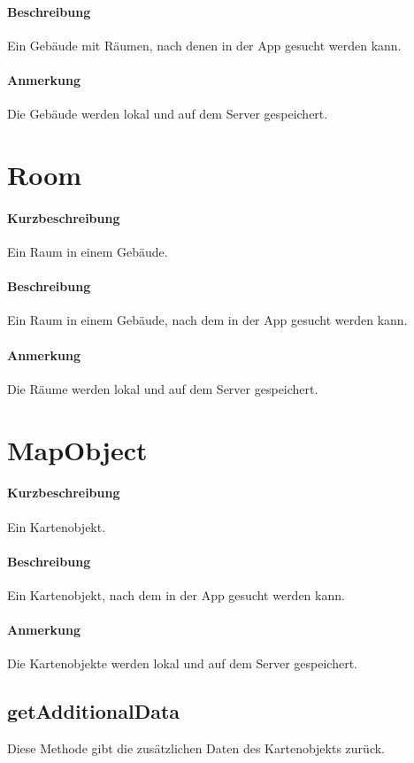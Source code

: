 \paragraph*{Beschreibung}
Ein Gebäude mit Räumen, nach denen in der App gesucht werden kann.
\paragraph*{Anmerkung}
Die Gebäude werden lokal und auf dem Server gespeichert.


\section{Room}
\paragraph*{Kurzbeschreibung}
Ein Raum in einem Gebäude.
\paragraph*{Beschreibung}
Ein Raum in einem Gebäude, nach dem in der App gesucht werden kann.
\paragraph*{Anmerkung}
Die Räume werden lokal und auf dem Server gespeichert.


\section{MapObject}
\paragraph*{Kurzbeschreibung}
Ein Kartenobjekt.
\paragraph*{Beschreibung}
Ein Kartenobjekt, nach dem in der App gesucht werden kann.
\paragraph*{Anmerkung}
Die Kartenobjekte werden lokal und auf dem Server gespeichert.

\subsection{getAdditionalData}%
Diese Methode gibt die zusätzlichen Daten des Kartenobjekts zurück.
